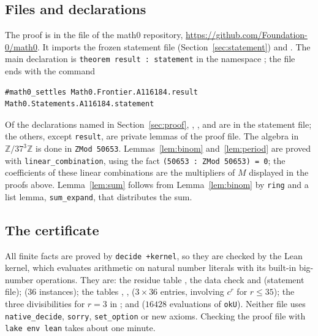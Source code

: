 \documentclass[11pt]{amsart}
\theoremstyle{plain}
\theoremstyle{definition}
\newcommand{\code}[1]{\texttt{#1}}
\newcommand{\Z}{\mathbb{Z}}
\newcommand{\Zm}{\Z/37^3\Z}
\begin{document}
\subsection*{Files and declarations}
The proof is in the file  of the math0 repository, \url{https://github.com/Foundation-0/math0}. It imports the frozen statement file (Section~\ref{sec:statement}) and . The main declaration is \code{theorem result : statement} in the namespace ; the file ends with the command
\begin{lstlisting}
#math0_settles Math0.Frontier.A116184.result Math0.Statements.A116184.statement
\end{lstlisting}
Of the declarations named in Section~\ref{sec:proof}, , ,  and  are in the statement file; the others, except \code{result}, are private lemmas of the proof file. The algebra in $\Zm$ is done in \code{ZMod 50653}. Lemmas~\ref{lem:binom} and~\ref{lem:period} are proved with \texttt{linear\_combination}, using the fact \code{(50653 : ZMod 50653) = 0}; the coefficients of these linear combinations are the multipliers of $M$ displayed in the proofs above. Lemma~\ref{lem:sum} follows from Lemma~\ref{lem:binom} by \texttt{ring} and a list lemma, \code{sum\_expand}, that distributes the sum.

\subsection*{The certificate}
All finite facts are proved by \texttt{decide +kernel}, so they are checked by the Lean kernel, which evaluates arithmetic on natural number literals with its built-in big-number operations. They are: the residue table , the data check  and  (statement file);  ($36$ instances); the tables , ,  ($3\times36$ entries, involving $c^r$ for $r\le35$); the three divisibilities for $r=3$ in ; and  ($16428$ evaluations of \code{okU}). Neither file uses \texttt{native\_decide}, \texttt{sorry}, \texttt{set\_option} or new axioms. Checking the proof file with \texttt{lake env lean} takes about one minute.
\end{document}
